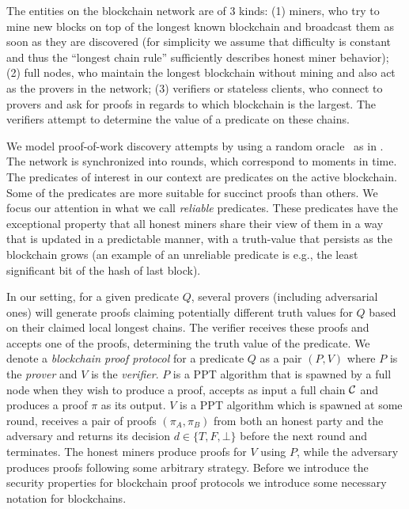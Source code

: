 The entities on the blockchain network are of 3 kinds: (1) miners, who
try to mine new blocks on top of the longest known blockchain and broadcast them
as soon as they are discovered (for simplicity we assume that difficulty
is constant and thus the ``longest chain rule'' sufficiently describes honest miner behavior); (2) full nodes, who maintain the longest
blockchain without mining and also act as the provers in the network; (3)
verifiers or stateless clients, who connect to provers and ask for proofs in
regards to which blockchain is the largest. The verifiers attempt to determine
the value of a predicate on these chains.

We model proof-of-work discovery attempts by using a random oracle~\cite{RO} as
in \cite{backbone}.
The network is synchronized into rounds, which correspond to moments in time.
The predicates of interest in our context are predicates on the active
blockchain. Some of the predicates are more suitable for succinct proofs than
others. We focus our attention in what we call \textit{reliable} predicates.
These predicates have the exceptional property that all honest miners share
their view of them in a way that is updated in a predictable manner, with a
truth-value that persists as the blockchain grows (an example of an unreliable
predicate is e.g., the least significant bit of the hash of last block).

In our setting, for a given predicate $Q$,
several  provers (including adversarial ones)
will generate proofs claiming potentially different truth values for
$Q$ based on their claimed local longest chains. The verifier
receives these proofs and accepts one of the proofs, determining the truth value
of the predicate.  We denote a  \textit{blockchain proof protocol} for a predicate $Q$ as a pair $(P, V)$ where $P$ is the \textit{prover} and $V$ is the \textit{verifier}. $P$ is a PPT algorithm that is spawned by a full node when they wish to produce a proof,
accepts as input a full chain $\mathcal{C}$ and produces a proof $\pi$ as its output.
$V$ is a PPT algorithm which is spawned at some round,
receives a pair of proofs $(\pi_A, \pi_B)$ from both an honest party and the
adversary and returns its decision $d \in \{T, F, \bot\}$ before the next round
and terminates. The honest miners produce proofs for $V$ using $P$, while the adversary produces proofs following some arbitrary strategy. Before we introduce the security properties for blockchain proof protocols we introduce some necessary notation for blockchains.

